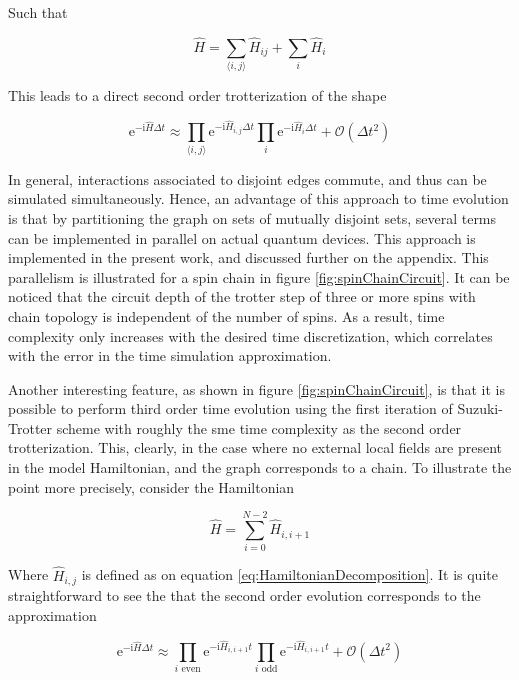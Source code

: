   Such that

  \begin{equation}
    \hat{H} = \sum_{\langle i,j \rangle} \hat{H}_{ij} + \sum_i \hat{H}_i
  \end{equation}

  This leads to a direct second order trotterization of the shape

  \begin{equation}
    \mathrm{e}^{-\mathrm{i}\hat{H}\Delta t} \approx \prod_{\langle i,j \rangle} \mathrm{e}^{-\mathrm{i}\hat{H}_{i,j}\Delta t} \prod_{i} \mathrm{e}^{-\mathrm{i}\hat{H}_i \Delta t} + \mathcal{O}(\Delta t^2)
    \label{eq:HamiltonianTrotterization}
  \end{equation}

  In general, interactions associated to disjoint edges commute, and thus can be simulated simultaneously. Hence, an advantage of this approach to time evolution is that by partitioning the graph on sets of mutually disjoint sets, several terms can be implemented in parallel on actual quantum devices. This approach is implemented in the present work, and discussed further on the appendix. This parallelism is illustrated for a spin chain in figure \ref{fig:spinChainCircuit}. It can be noticed that the circuit depth of the trotter step of three or more spins with chain topology is independent of the number of spins. As a result, time complexity only increases with the desired time discretization, which correlates with the error in the time simulation approximation. 
  
  Another interesting feature, as shown in figure \ref{fig:spinChainCircuit}, is that it is possible to perform third order time evolution using the first iteration of Suzuki-Trotter scheme with roughly the sme time complexity as the second order trotterization. This, clearly, in the case where no external local fields are present in the model Hamiltonian, and the graph corresponds to a chain. To illustrate the point more precisely, consider the Hamiltonian

  \begin{equation}
    \hat{H} = \sum_{i=0}^{N-2} \hat{H}_{i,i+1}
    \label{eq:ChainHamiltonian}
  \end{equation}

  Where $\hat{H}_{i,j}$ is defined as on equation \ref{eq:HamiltonianDecomposition}. It is quite straightforward to see the that the second order evolution corresponds to the approximation

  \begin{equation}
    \mathrm{e}^{-\mathrm{i}\hat{H}\Delta t} \approx \prod_{i \text{ even}} \mathrm{e}^{-\mathrm{i}\hat{H}_{i,i+1}t} \prod_{i \text{ odd}} \mathrm{e}^{-\mathrm{i}\hat{H}_{i,i+1}t} + \mathcal{O}(\Delta t^2)
    \label{eq:HamiltonianTrotterization}
  \end{equation}

